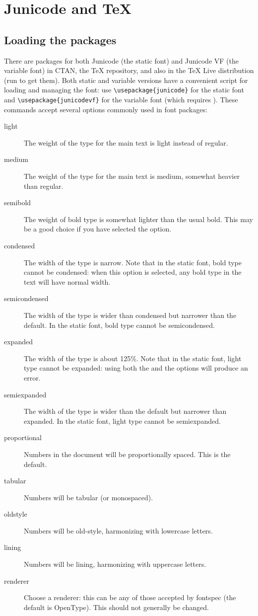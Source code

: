 \chapter{Junicode and {\TeX}}\hypertarget{JunicodeAndTeX}{}

\section{Loading the packages}

There are packages for both Junicode (the static font) and Junicode VF (the variable font) 
in CTAN, the {\TeX} repository, and also
in the {\TeX} Live distribution (run  to get them). Both static and variable versions
have a convenient script for loading and managing the font: use
{\color{BrickRed}\verb|\usepackage{junicode}|} for the static font and
{\color{BrickRed}\verb|\usepackage{junicodevf}|} for the variable font (which requires \ltech).
These commands accept several options commonly used in font packages:

\begin{description}
    \item[light] The weight of the type for the main text is light instead of regular.
    \item[medium] The weight of the type for the main text is medium, somewhat heavier than regular.
    \item[semibold] The weight of bold type is somewhat lighter than the usual bold. This may be a
    good choice if you have selected the  option.
    \item[condensed] The width of the type is narrow. Note that in the static font,
    bold type cannot be condensed: when
    this option is selected, any bold type in the text will have normal width.
    \item[semicondensed] The width of the type is wider than condensed but narrower than the default.
    In the static font, bold type cannot be semicondensed.
    \item[expanded] The width of the type is about 125\%. Note that in the static font, light type
    cannot be expanded: using both the  and the  options will produce
    an error.
    \item[semiexpanded] The width of the type is wider than the default but narrower than expanded.
    In the static font, light type cannot be semiexpanded.
    \item[proportional] Numbers in the document will be proportionally spaced. This is the default.
    \item[tabular] Numbers will be tabular (or monospaced).
    \item[oldstyle] Numbers will be old-style, harmonizing with lowercase letters.
    \item[lining] Numbers will be lining, harmonizing with uppercase letters.
    \item[renderer] Choose a renderer: this can be any of those accepted by fontspec (the default
    is OpenType). This should not generally be changed.
\end{description}

